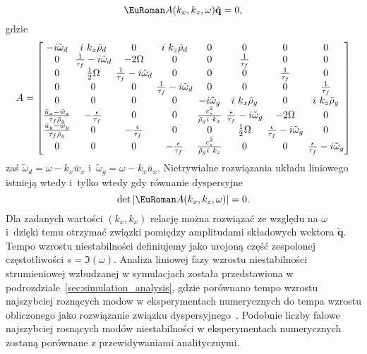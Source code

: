 \begin{equation}
 \eurom{A}(k_x,k_z,\omega)\tilde{\mathbf{q}} = 0,
 \label{eq:linset}
\end{equation}
gdzie 
\begin{equation}
 A =
 \setlength\arraycolsep{2pt}
 \begin{bmatrix}
    -i\tilde{\omega}_d & i~k_x \bar{\rho}_d & 0 & i~k_z \bar{\rho}_d & 0 & 0 & 0 & 0 \\
    0 & \frac{1}{\tau_f} -i \tilde{\omega}_d & -2\Omega & 0 & 0 & \frac{1}{\tau_f} & 0 & 0 \\
    0 & \frac{1}{2}\Omega & \frac{1}{\tau_f} -i \tilde{\omega}_d & 0 & 0 & 0 & \frac{1}{\tau_f} & 0 \\
    0 & 0 & 0 & \frac{1}{\tau_f} -i \tilde{\omega}_d & 0 & 0 & 0 & \frac{1}{\tau_f} \\
    0 & 0 & 0 & 0 & -i\tilde{\omega}_g & i~k_x \bar{\rho}_g & 0 & i~k_z \bar{\rho}_g \\
    \frac{\bar{u}_x - \bar{w}_x}{\tau_f \bar{\rho}_g} & -\frac{\epsilon}{\tau_f} & 0 & 0 &
    \frac{c_s^2}{\bar{\rho}_g i~k_x} & \frac{\epsilon}{\tau_f}-i\tilde{\omega}_g &
    -2\Omega & 0\\
    \frac{\bar{u}_y - \bar{w}_y}{\tau_f \bar{\rho}_g} & 0 & -\frac{\epsilon}{\tau_f} & 0 & 0 &
    \frac{1}{2}\Omega & \frac{\epsilon}{\tau_f} -i \tilde{\omega}_g & 0 \\
    0 & 0 & 0 & -\frac{\epsilon}{\tau_f} & \frac{c_s^2}{\bar{\rho}_g i~k_z} & 0 & 0 &
    \frac{\epsilon}{\tau_f} -i \tilde{\omega}_g
 \end{bmatrix}
%
\end{equation}
zaś $\tilde{\omega}_d = \omega - k_x \bar{w}_x$ i~$\tilde{\omega}_g = \omega -
k_x \bar{u}_x$.
%
Nietrywialne rozwiązania układu liniowego  istnieją wtedy i~tylko
wtedy gdy równanie dyspersyjne 
\begin{equation}
 \det|\eurom{A}(k_x,k_z,\omega)|=0.
 \label{eq:disprel}
\end{equation}
%
Dla zadanych wartości $(k_x, k_x)$ relację  można rozwiązać ze
względu na $\omega$ i~dzięki temu otrzymać związki pomiędzy amplitudami
składowych wektora $\tilde{\mathbf{q}}$.
Tempo wzrostu niestabilności definiujemy jako urojoną część zespolonej
częstotliwości $s=\Im(\omega)$.
%
Analiza  liniowej fazy wzrostu niestabilności strumieniowej wzbudzanej w
symulacjach została przedstawiona w podrozdziale~\ref{sec:simulation_analysis},
gdzie porównano tempo wzrostu najszybciej roznących modow w eksperymentach
numerycznych do tempa wzrostu obliczonego jako rozwiązanie związku
dyspersyjnego~. Podobnie liczby falowe  najszybciej rosnących
modów niestabilności w eksperymentach numerycznych zostaną porównane z
przewidywaniami analitycznymi.

